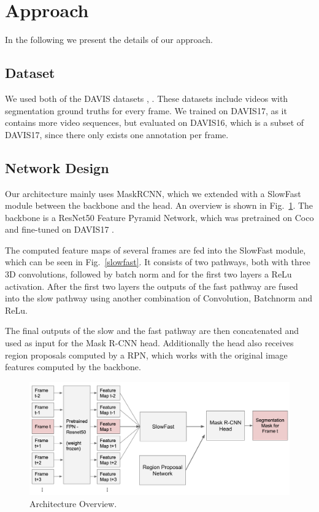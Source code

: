 \section{Approach}
In the following we present the details of our approach.
\subsection{Dataset}
We used both of the DAVIS datasets \cite{davis_2016, davis_2017}, . These datasets include videos with segmentation ground truths for every frame. We trained on DAVIS17, as it contains more video sequences, but evaluated on DAVIS16, which is a subset of DAVIS17, since there only exists one annotation per frame. %
\subsection{Network Design}
Our architecture mainly uses MaskRCNN, which we extended with a SlowFast module between the backbone and the head. An overview is shown in   Fig.~\ref{architecture}. The backbone is a ResNet50 Feature Pyramid Network, which was pretrained on Coco %
and fine-tuned on DAVIS17 \cite{davis_2017}.

The computed feature maps of several frames are fed into the SlowFast module, which can be seen in Fig.~\ref{slowfast}. It consists of two pathways, both with three 3D convolutions, followed by batch norm and for the first two layers a ReLu activation. After the first two layers the outputs of the fast pathway are fused into the slow pathway using another combination of Convolution, Batchnorm and ReLu.

The final outputs of the slow and the fast pathway are then concatenated and used as input for the Mask R-CNN head. Additionally the head also receives region proposals computed by a RPN, which works with the original image features computed by the backbone.

\begin{figure}
	\centering
	\includegraphics[width=\columnwidth]{figures/architecture.png}
	\caption{Architecture Overview.}
	\label{architecture}
\end{figure}

